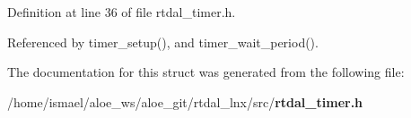 Definition at line 36 of file rtdal\-\_\-timer.\-h.



Referenced by timer\-\_\-setup(), and timer\-\_\-wait\-\_\-period().



The documentation for this struct was generated from the following file\-:\begin{DoxyCompactItemize}
\item 
/home/ismael/aloe\-\_\-ws/aloe\-\_\-git/rtdal\-\_\-lnx/src/{\bf rtdal\-\_\-timer.\-h}\end{DoxyCompactItemize}
